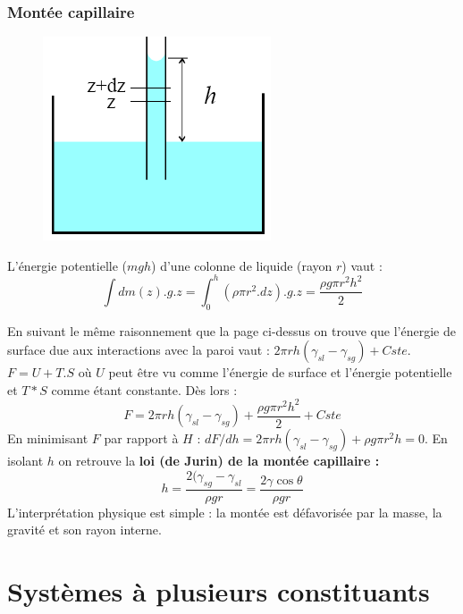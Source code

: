 \documentclass[11pt, a4paper, openany]{book}
\begin{document}
\subsubsection{Montée capillaire}
\begin{figure}
\includegraphics[scale=0.4]{cp/image16.png}
\end{figure}
L'énergie potentielle ($mgh$) d'une colonne de liquide (rayon $r$) vaut :
\begin{equation}
\int dm(z).g.z = \int_0^h (\rho \pi r^2.dz).g.z = \frac{\rho g \pi r^2 h^2}{2}
\end{equation}

En suivant le même raisonnement que la page ci-dessus on trouve que l'énergie de surface due aux interactions avec la paroi vaut : $2\pi r h(\gamma_{sl}-\gamma_{sg}) + Cste$.\\
$F = U + T.S$ où $U$ peut être vu comme l'énergie de surface et l'énergie potentielle et $T*S$ comme étant constante. Dès lors : 
\begin{equation}
F = 2\pi r h(\gamma_{sl}-\gamma_{sg}) + \frac{\rho g \pi r^2 h^2}{2} + Cste
\end{equation}
En minimisant $F$ par rapport à $H$ : $dF/dh = 2\pi r h(\gamma_{sl}-\gamma_{sg}) + \rho g \pi r^2 h = 0$. En isolant $h$ on retrouve la \textbf{loi (de Jurin) de la montée capillaire :}
\begin{equation}
h = \frac{2(\gamma_{sg}-\gamma_{sl}}{\rho g r} = \frac{2\gamma \cos\theta}{\rho g r}
\end{equation}
L'interprétation physique est simple : la montée est défavorisée par la masse, la gravité et son rayon interne.

\section{Systèmes à plusieurs constituants}
\end{document}
